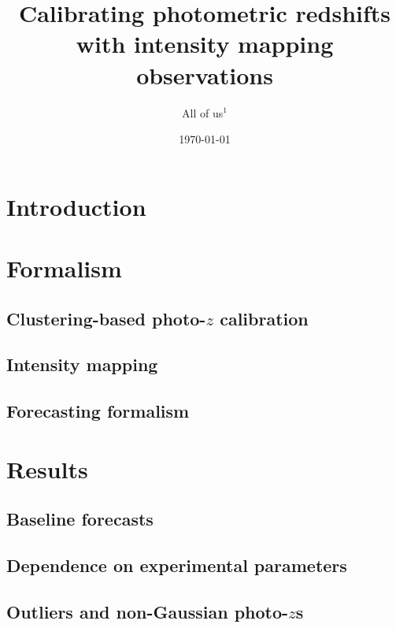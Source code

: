 \documentclass[prd,twocolumn]{revtex4}
\begin{document}
\title{Calibrating photometric redshifts with intensity mapping observations}
\author{All of us$^1$}

\begin{abstract}
  \lipsum[0]
\end{abstract}

  \date{\today}
  \maketitle

\section{Introduction}\label{sec:intro}
  \lipsum[1]
  
\section{Formalism}\label{sec:method}
  \subsection{Clustering-based photo-$z$ calibration}\label{ssec:method.clustred}
    \lipsum[2]
  \subsection{Intensity mapping}\label{ssec:method.imap}
    \lipsum[3]
  \subsection{Forecasting formalism}\label{ssec:method.fisher}
    \lipsum[4]

\section{Results} \label{sec:results}
  \subsection{Baseline forecasts} \label{ssec:results.baseline}
    \lipsum[5]
  \subsection{Dependence on experimental parameters} \label{ssec:results.params}
    \lipsum[6]
  \subsection{Outliers and non-Gaussian photo-$z$s} \label{ssec:results.outliers}
    \lipsum[7]
\end{document}
